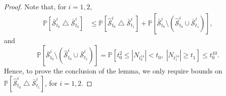\documentclass[12pt,oneside]{amsart}
\theoremstyle{definition}
\newcommand{\Scc}{\hat{\mathcal S}}
\newcommand{\Sccc}{\bar{\mathcal S}}
\def\P{{\mathbb P}}
\numberwithin{equation}{section}
\begin{document}
\begin{proof}
    Note that, for $i = 1, 2$,
    \begin{equation}
    	\begin{split}
    		\P [ \Sccc^i_{t_0} \bigtriangleup \Sccc^i_{t_0}] & \leq \P [\Scc^i_{t_0} \bigtriangleup \Sccc^i_{t_1}] + \P[\Sccc^i_{t_0} \setminus (\Scc^i_{t_0} \cup \Sccc^i_{t_1})],
    	\end{split}
    \end{equation}
    and
    \begin{equation}
    	\P[\Sccc^i_{t_0} \setminus (\Scc^i_{t_0} \cup \Sccc^i_{t_1})] = \P[t_0^2 \leq |N_{t_0^{14}}| < t_0, \; |N_{t_1^{14}}| \geq t_1] \leq t_0^{10}.
    \end{equation}
    Hence, to prove the conclusion of the lemma, we only require bounds on $\P [\Scc^i_{t_0} \bigtriangleup \Sccc^i_{t_1}]$, for $i = 1, 2$.
   

\end{proof}
\end{document}
